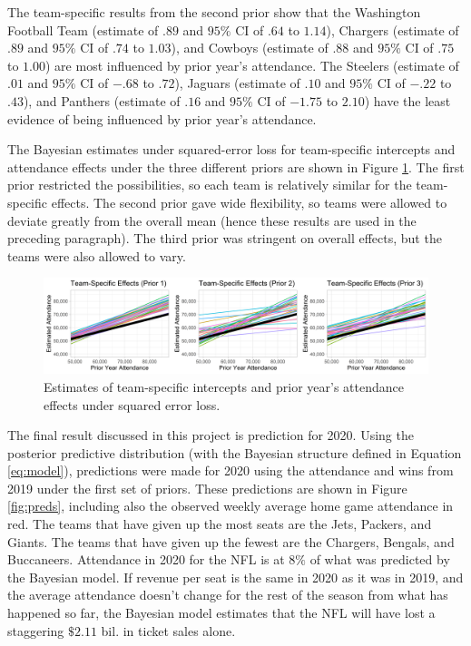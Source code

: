 \documentclass[11pt]{article}
\begin{document}
The team-specific results from the second prior show that the Washington Football Team (estimate of $.89$ and $95\%$ CI of $.64$ to $1.14$), Chargers (estimate of $.89$ and $95\%$ CI of $.74$ to $1.03$), and Cowboys (estimate of $.88$ and $95\%$ CI of $.75$ to $1.00$) are most influenced by prior year's attendance. The Steelers (estimate of $.01$ and $95\%$ CI of $-.68$ to $.72$), Jaguars (estimate of $.10$ and $95\%$ CI of $-.22$ to $.43$), and Panthers (estimate of $.16$ and $95\%$ CI of $-1.75$ to $2.10$) have the least evidence of being influenced by prior year's attendance. 

The Bayesian estimates under squared-error loss for team-specific intercepts and attendance effects under the three different priors are shown in Figure \ref{fig:team_spec}. The first prior restricted the possibilities, so each team is relatively similar for the team-specific effects. The second prior gave wide flexibility, so teams were allowed to deviate greatly from the overall mean (hence these results are used in the preceding paragraph). The third prior was stringent on overall effects, but the teams were also allowed to vary.

\begin{figure}
    \centering
    \includegraphics[width=\textwidth]{team_specific.png}
    \caption{\footnotesize Estimates of team-specific intercepts and prior year's attendance effects under squared error loss. \vspace*{-.5\baselineskip}}
    \label{fig:team_spec}
\end{figure}

The final result discussed in this project is prediction for 2020. Using the posterior predictive distribution (with the Bayesian structure defined in Equation \ref{eq:model}), predictions were made for 2020 using the attendance and wins from 2019 under the first set of priors. These predictions are shown in Figure \ref{fig:preds}, including also the observed weekly average home game attendance in red. The teams that have given up the most seats are the Jets, Packers, and Giants. The teams that have given up the fewest are the Chargers, Bengals, and Buccaneers. Attendance in 2020 for the NFL is at $8\%$ of what was predicted by the Bayesian model. If revenue per seat is the same in 2020 as it was in 2019, and the average attendance doesn't change for the rest of the season from what has happened so far, the Bayesian model estimates that the NFL will have lost a staggering $\$2.11$ bil. in ticket sales alone.  
\end{document}
